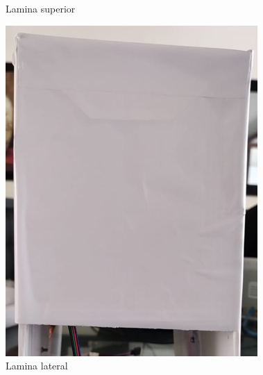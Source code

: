 \begin{figure}[H]
\begin{minipage}[b]{0.35\linewidth}
				\caption{Lamina superior}
				\label{fig:superior}
			\end{minipage}
		\end{figure}
	
		\begin{figure}[H]
			\begin{minipage}[b]{0.35\linewidth}
				\centering
				\centering
				\includegraphics[width=\linewidth]{Figs/302.png}
				\caption{Lamina lateral}
				\label{fig:lateral}
			\end{minipage}
			\hspace{2.5cm}
			\begin{minipage}[b]{0.35\linewidth}
				\centering
				\centering

\end{minipage}
\end{figure}
